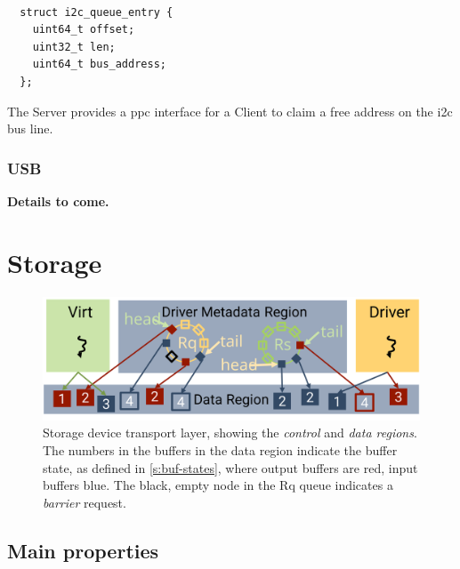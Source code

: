 \documentclass[a4paper,12pt]{report}
\newcommand{\ToCome}[1]{\textbf{#1 to come.}}
\newcommand{\Obj}[1]{\textsl{#1}}
\newcommand{\figscale}{0.2}
\begin{document}
\begin{lstlisting}[gobble=2,firstline=2,float=th,
  label={l:i2c_queue_entry},
  caption={I2C request and response queue entry data structure.}]

  struct i2c_queue_entry {
    uint64_t offset;
    uint32_t len;
    uint64_t bus_address;
  };
\end{lstlisting}

The Server provides a \gls{ppc} interface for a Client to claim
a free address on the \gls{i2c} bus line.

\subsubsection{USB}\label{s:cl-usb}

\ToCome{Details}

\section{Storage}\label{s:cl-storage}

\begin{figure}[th]
  \centering
  \includegraphics[scale=\figscale]{metadata-storage}
  \caption[Storage device transport layer.]{Storage device transport layer, showing the
    \Obj{control} and \Obj{data regions}. The numbers in the
    buffers in the data region indicate the buffer state, as defined
    in \autoref{s:buf-states}, where output
    buffers are red, input buffers blue. The black, empty node in the
    Rq queue indicates a \emph{barrier} request.}
  \label{f:control-storage}
\end{figure}

\subsection{Main properties}\label{s:cl-storage-props}
\end{document}
